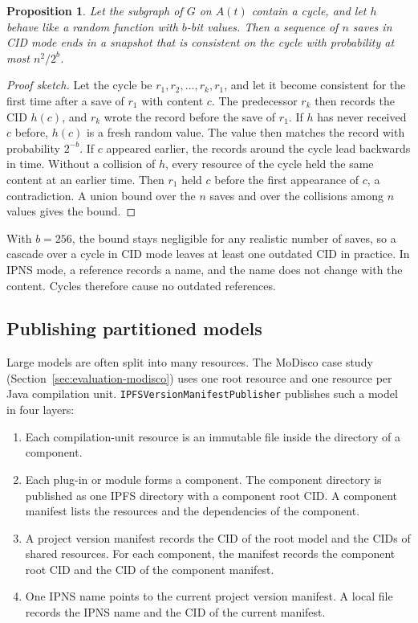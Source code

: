 \documentclass[5p,times,twocolumn]{elsarticle}
\theoremstyle{definition}
\theoremstyle{plain}
\newtheorem{proposition}{Proposition}
\begin{document}
\begin{proposition}\label{prop:cycle}
Let the subgraph of $G$ on $A(t)$ contain a cycle, and let $h$ behave like a random function with $b$-bit values. Then a sequence of $n$ saves in CID mode ends in a snapshot that is consistent on the cycle with probability at most $n^2/2^b$.
\end{proposition}

\begin{proof}[Proof sketch]
Let the cycle be $r_1, r_2, \ldots, r_k, r_1$, and let it become consistent for the first time after a save of $r_1$ with content $c$. The predecessor $r_k$ then records the CID $h(c)$, and $r_k$ wrote the record before the save of $r_1$. If $h$ has never received $c$ before, $h(c)$ is a fresh random value. The value then matches the record with probability $2^{-b}$. If $c$ appeared earlier, the records around the cycle lead backwards in time. Without a collision of $h$, every resource of the cycle held the same content at an earlier time. Then $r_1$ held $c$ before the first appearance of $c$, a contradiction. A union bound over the $n$ saves and over the collisions among $n$ values gives the bound.
\end{proof}

With $b = 256$, the bound stays negligible for any realistic number of saves, so a cascade over a cycle in CID mode leaves at least one outdated CID in practice. In IPNS mode, a reference records a name, and the name does not change with the content. Cycles therefore cause no outdated references.

\subsection{Publishing partitioned models}\label{sec:rq2-partitioned}

Large models are often split into many resources. The MoDisco case study (Section~\ref{sec:evaluation-modisco}) uses one root resource and one resource per Java compilation unit. \texttt{IPFSVersionManifestPublisher} publishes such a model in four layers:
\begin{enumerate}
\item Each compilation-unit resource is an immutable file inside the directory of a component.
\item Each plug-in or module forms a component. The component directory is published as one IPFS directory with a component root CID. A component manifest lists the resources and the dependencies of the component.
\item A project version manifest records the CID of the root model and the CIDs of shared resources. For each component, the manifest records the component root CID and the CID of the component manifest.
\item One IPNS name points to the current project version manifest. A local file records the IPNS name and the CID of the current manifest.
\end{enumerate}
\end{document}

